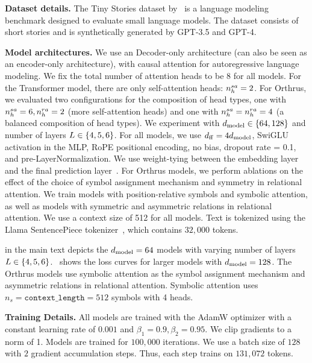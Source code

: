 
\textbf{Dataset details.} The Tiny Stories dataset by~\citet{eldanTinyStoriesHowSmall2023} is a language modeling benchmark designed to evaluate small language models. The dataset consists of short stories and is synthetically generated by GPT-3.5 and GPT-4.

\textbf{Model architectures.} We use an Decoder-only architecture (can also be seen as an encoder-only architecture), with causal attention for autoregressive language modeling. We fix the total number of attention heads to be $8$ for all models. For the Transformer model, there are only self-attention heads: $n_h^{sa} = 2$. For Orthrus, we evaluated two configurations for the composition of head types, one with $n_h^{sa} = 6, n_h^{ra} = 2$ (more self-attention heads) and one with $n_h^{sa} = n_h^{ra} = 4$ (a balanced composition of head types). We experiment with $d_{\mathrm{model}} \in \{64, 128\}$ and number of layers $L \in \{4, 5, 6\}$. For all models, we use $d_{\mathrm{ff}} = 4 d_{\mathrm{model}}$, SwiGLU activation in the MLP, RoPE positional encoding, no bias, dropout rate = 0.1, and pre-LayerNormalization. We use weight-tying between the embedding layer and the final prediction layer~\citep{inanTyingWordVectors2016}. For Orthrus models, we perform ablations on the effect of the choice of symbol assignment mechanism and symmetry in relational attention. We train models with position-relative symbols and symbolic attention, as well as models with symmetric and asymmetric relations in relational attention. We use a context size of 512 for all models. Text is tokenized using the Llama SentencePiece tokenizer~\citep{touvronLlamaOpenFoundation2023}, which contains $32,000$ tokens.

 in the main text depicts the $d_{\mathrm{model}} = 64$ models with varying number of layers $L \in \{4, 5, 6\}$.~ shows the loss curves for larger models with $d_{\mathrm{model}} = 128$. The Orthrus models use symbolic attention as the symbol assignment mechanism and asymmetric relations in relational attention. Symbolic attention uses $n_s = \texttt{context\_length} = 512$ symbols with 4 heads.

\textbf{Training Details.} All models are trained with the AdamW optimizer with a constant learning rate of $0.001$ and $\beta_1 = 0.9, \beta_2 = 0.95$. We clip gradients to a norm of 1. Models are trained for $100,000$ iterations. We use a batch size of $128$ with $2$ gradient accumulation steps. Thus, each step trains on $131,072$ tokens.

